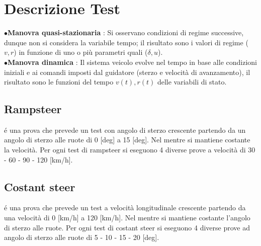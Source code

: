 \section{Descrizione Test}
$\bullet$\textbf{Manovra quasi-stazionaria} : Si osservano condizioni di regime successive, dunque non si considera la variabile tempo; 
il risultato sono i valori di regime ($v,r$) in funzione di uno o più parametri quali ($\delta,u$).\\
$\bullet$\textbf{Manovra dinamica} : Il sistema veicolo evolve nel tempo in base alle condizioni iniziali e ai comandi imposti dal guidatore (sterzo e velocità di avanzamento), 
il risultato sono le funzioni del tempo $v(t),r(t)$ delle variabili di stato.\\


\subsection{Rampsteer}
é una prova che prevede un test con angolo di sterzo crescente partendo da un angolo di sterzo alle ruote di 0 [deg] a 15 [deg].
Nel mentre si mantiene costante la velocità.
Per ogni test di rampsteer si eseguono 4 diverse prove a velocità di 30 - 60 - 90 - 120 [km/h].

\subsection{Costant steer}
é una prova che prevede un test a velocità longitudinale crescente partendo da una velocità di 0 [km/h] a 120 [km/h].
Nel mentre si mantiene costante l'angolo di sterzo alle ruote.
Per ogni test di costant steer si eseguono 4 diverse prove ad angolo di sterzo alle ruote di 5 - 10 - 15 - 20 [deg].

